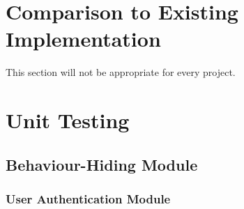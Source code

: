 \documentclass[12pt, titlepage]{article}
\begin{document}
\section{Comparison to Existing Implementation}	

This section will not be appropriate for every project.

\section{Unit Testing}

\subsection{Behaviour-Hiding Module}

\subsubsection{User Authentication Module}
\end{document}
